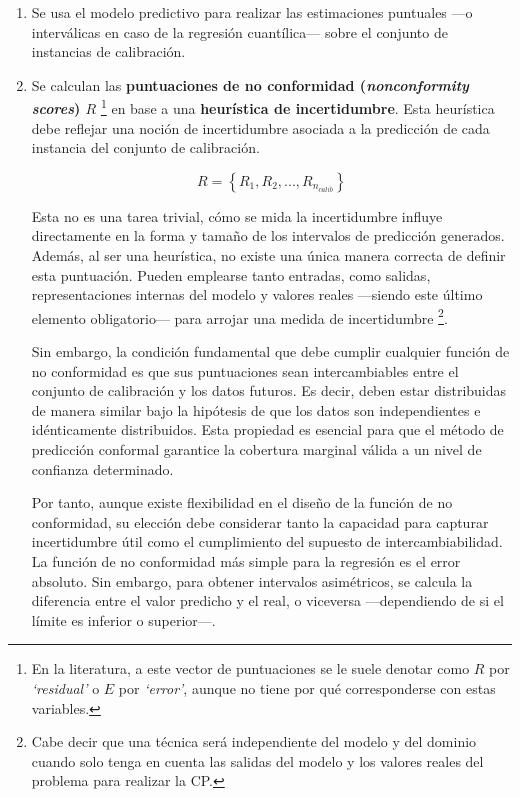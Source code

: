 \begin{enumerate}
    \item Se usa el modelo predictivo para realizar las estimaciones puntuales ---o interválicas en caso de la
    regresión cuantílica--- sobre el conjunto de instancias de calibración. 

    
    \item Se calculan las \textbf{puntuaciones de no conformidad (\textit{nonconformity scores}) $R$}
    \footnote{
        En la literatura, a este vector de puntuaciones se le suele denotar como $R$ por \textit{`residual'}
        o $E$ por \textit{`error'}, aunque no tiene por qué corresponderse con estas variables. 
    } en base a una \textbf{heurística de incertidumbre}.
    Esta heurística debe reflejar una noción de incertidumbre asociada a la predicción de cada instancia del
    conjunto de calibración. 

    $$
    R = \left\{ R_1, R_2, ..., R_{n_{calib}} \right\}
    $$

    Esta no es una tarea trivial, cómo se mida la incertidumbre influye directamente en la forma y tamaño de 
    los intervalos de predicción generados. Además, al ser una heurística, no existe una única manera 
    correcta de definir esta puntuación. Pueden emplearse tanto entradas, como salidas, representaciones 
    internas del modelo y valores reales ---siendo este último elemento obligatorio--- para arrojar una 
    medida de incertidumbre
    \footnote{
        Cabe decir que una técnica será independiente del modelo y del dominio cuando solo tenga en cuenta
        las salidas del modelo y los valores reales del problema para realizar la CP.
    }. 

    Sin embargo, la condición fundamental que debe cumplir cualquier función de no conformidad es que sus 
    puntuaciones sean intercambiables entre el conjunto de calibración y los datos futuros. Es decir, deben 
    estar distribuidas de manera similar bajo la hipótesis de que los datos son independientes e idénticamente 
    distribuidos. Esta propiedad es esencial para que el método de predicción conformal garantice la 
    cobertura marginal válida a un nivel de confianza determinado.

    Por tanto, aunque existe flexibilidad en el diseño de la función de no conformidad, su elección debe 
    considerar tanto la capacidad para capturar incertidumbre útil como el cumplimiento del supuesto de 
    intercambiabilidad. 
    La función de no conformidad más simple para la regresión es el error absoluto. Sin embargo, para obtener
    intervalos asimétricos, se calcula la diferencia entre el valor predicho y el real, o viceversa 
    ---dependiendo de si el límite es inferior o superior---. 



\end{enumerate}

